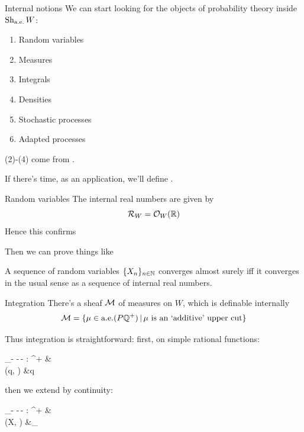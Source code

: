 \begin{frame}{Internal notions}
	We can start looking for the objects of probability theory inside $\operatorname{Sh}_{\text{a.e.}} W$:

	\vfill
	\begin{enumerate}
		\item Random variables
		\item Measures
		\item Integrals
		\item Densities
		\item Stochastic processes
		\item Adapted processes
	\end{enumerate}

	\vfill
	(2)-(4) come from \cite{jackson2006sheaf}.

	\vfill
	If there's time, as an application, we'll define .
\end{frame}

\begin{frame}{Random variables}
	The internal real numbers are given by
	\begin{equation*}
		\mathcal{R}_W = \mathcal{O}_W(\mathbb{R})
	\end{equation*}
	Hence this confirms 

	\vfill
	Then we can prove things like
	\begin{theorem}
		A sequence of random variables $\{X_n\}_{n \in \mathbb{N}}$ converges almost surely iff it converges in the usual sense as a sequence of internal real numbers.
	\end{theorem}

\end{frame}

\begin{frame}{Integration}
	There's a sheaf $\mathcal{M}$ of measures on $W$, which is definable internally
	\begin{equation*}
		\mathcal{M} = \{ \mu \in \text{a.e.}(P\mathbb{Q}^+) \,|\, \text{$\mu$ is an `additive' upper cut}\}
	\end{equation*}

	\vfill
	Thus integration is straightforward: first, on simple rational functions:
	\begin{eqalign*}
		\int_- -\,\de - : \QNO^+ \times \M &\longto \M\\
		(q, \mu) &\longmapsto q \mu
	\end{eqalign*}
	then we extend by continuity:
	\begin{eqalign*}
		\int_- -\,\de - : \RNO^+ \times \M &\longto \M\\
		(X, \mu) &\longmapsto {}_\gold{\int_{-} X\,\de\mu}
	\end{eqalign*}
\end{frame}

